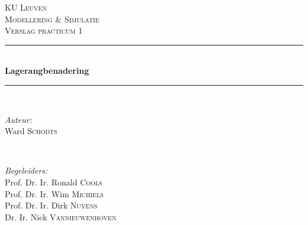 \documentclass[11pt,a4paper]{article}
\begin{document}
\begin{titlepage}

\newcommand{\HRule}{\rule{\linewidth}{0.5mm}} %

\center %
 

\textsc{\textsc{\LARGE KU Leuven}}\\[1.5cm] %
\textsc{\Large Modellering \& Simulatie}\\[0.5cm] %
\textsc{\large Verslag practicum 1}\\[0.5cm] %


\HRule \\[0.4cm]
{ \huge \bfseries Lagerangbenadering}\\[0.4cm] %
\HRule \\[1.5cm]
 

\begin{minipage}{0.4\textwidth}
\begin{flushleft} \large
\emph{Auteur:}\\
Ward \textsc{Schodts} %
\end{flushleft}
\end{minipage}
~
\begin{minipage}{0.4\textwidth}
\begin{flushright} \large
\emph{Begeleiders:} \\
Prof. Dr. Ir. Ronald \textsc{Cools} \\ %
Prof. Dr. Ir. Wim \textsc{Michiels} \\ %
Prof. Dr. Ir. Dirk \textsc{Nuyens} \\ %
Dr. Ir. Nick \textsc{Vannieuwenhoven} \\ %
\end{flushright}
\end{minipage}\\[4cm]


\end{titlepage}
\end{document}
